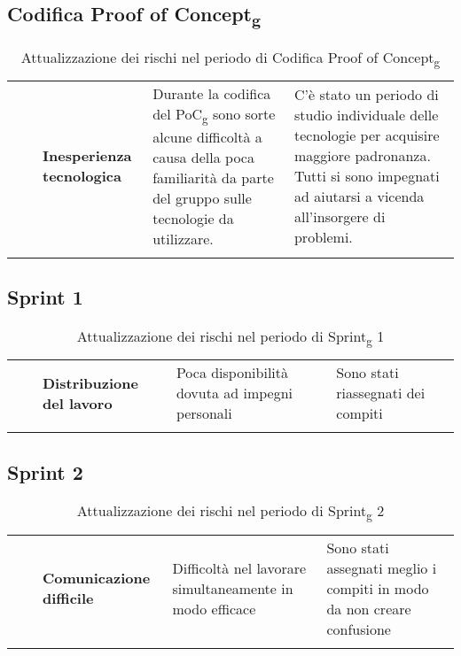 \subsection{Codifica Proof of Concept\textsubscript{g}}
\begin{longtable}{ 
	>{\centering}M{0.20\textwidth} 
	>{\raggedright}M{0.30\textwidth}
	>{\raggedright}M{0.40\textwidth}
	}
	\rowcolorhead
	\centering 
	 &	
	 &
	\endfirsthead	
	\endhead
	
	\textbf{Inesperienza tecnologica} & 
    Durante la codifica del PoC\textsubscript{g} sono sorte alcune difficoltà a causa della poca
    familiarità da parte del gruppo sulle tecnologie da utilizzare. & 
    C'è stato un periodo di studio individuale delle tecnologie per acquisire maggiore padronanza. 
    Tutti si sono impegnati ad aiutarsi a vicenda all'insorgere di problemi. \tabularnewline
	\captionline \caption{Attualizzazione dei rischi nel periodo di Codifica Proof of Concept\textsubscript{g}}
\end{longtable}

\subsection{Sprint 1}
\begin{longtable}{ 
	>{\centering}M{0.20\textwidth} 
	>{\raggedright}M{0.30\textwidth}
	>{\raggedright}M{0.40\textwidth}
	}
	\rowcolorhead
	\centering 
	 &	
	 &
	\endfirsthead	
	\endhead
	
	\textbf{Distribuzione del lavoro} & Poca disponibilità dovuta ad impegni personali & Sono stati riassegnati dei 
	compiti \tabularnewline
	\captionline \caption{Attualizzazione dei rischi nel periodo di Sprint\textsubscript{g} 1}
\end{longtable}

\subsection{Sprint 2}
\begin{longtable}{ 
	>{\centering}M{0.20\textwidth} 
	>{\raggedright}M{0.30\textwidth}
	>{\raggedright}M{0.40\textwidth}
	}
	\rowcolorhead
	\centering 
	 &	
	 &
	\endfirsthead	
	\endhead
	
	\textbf{Comunicazione difficile} & Difficoltà nel lavorare simultaneamente in modo efficace & Sono stati assegnati meglio i compiti in modo da non creare confusione \tabularnewline
	\captionline \caption{Attualizzazione dei rischi nel periodo di Sprint\textsubscript{g} 2}
\end{longtable}

